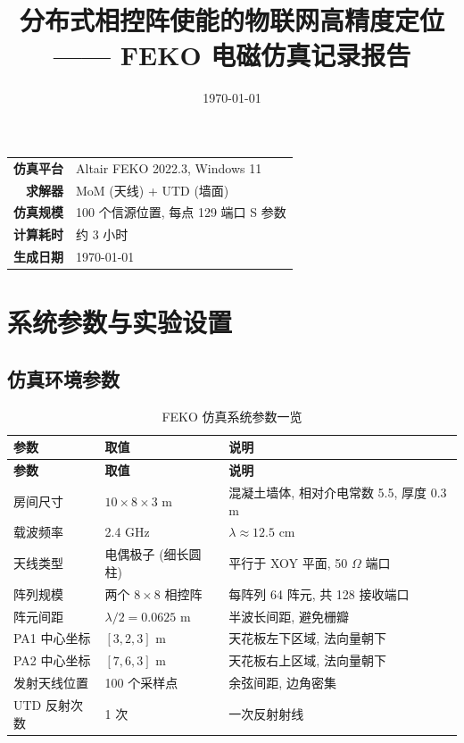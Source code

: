 \documentclass[12pt,a4paper]{ctexart}
\title{\textbf{分布式相控阵使能的物联网高精度定位\\—— FEKO 电磁仿真记录报告}}
\author{}
\date{\today}
\begin{document}
\maketitle

\begin{center}
\vspace{1cm}
\begin{tabular}{rl}
\toprule
\textbf{仿真平台} & Altair FEKO 2022.3, Windows 11 \\
\textbf{求解器}   & MoM (天线) + UTD (墙面) \\
\textbf{仿真规模} & 100 个信源位置, 每点 129 端口 S 参数 \\
\textbf{计算耗时} & 约 3 小时 \\
\textbf{生成日期} & \today \\
\bottomrule
\end{tabular}
\end{center}

\vspace{1cm}

\section{系统参数与实验设置}

\subsection{仿真环境参数}

\begin{longtable}{lll}
\caption{FEKO 仿真系统参数一览}\\
\toprule
\textbf{参数} & \textbf{取值} & \textbf{说明} \\
\midrule
\endfirsthead
\toprule
\textbf{参数} & \textbf{取值} & \textbf{说明} \\
\midrule
\endhead
\bottomrule
\endfoot
房间尺寸        & $10 \times 8 \times 3$ m  & 混凝土墙体, 相对介电常数 5.5, 厚度 0.3 m \\
载波频率        & 2.4 GHz                   & $\lambda \approx 12.5$ cm \\
天线类型        & 电偶极子 (细长圆柱)       & 平行于 XOY 平面, 50 $\Omega$ 端口 \\
阵列规模        & 两个 $8\times8$ 相控阵    & 每阵列 64 阵元, 共 128 接收端口 \\
阵元间距        & $\lambda/2 = 0.0625$ m    & 半波长间距, 避免栅瓣 \\
PA1 中心坐标    & $[3, 2, 3]$ m             & 天花板左下区域, 法向量朝下 \\
PA2 中心坐标    & $[7, 6, 3]$ m             & 天花板右上区域, 法向量朝下 \\
发射天线位置    & 100 个采样点              & 余弦间距, 边角密集 \\
UTD 反射次数    & 1 次                      & 一次反射射线 \\
\bottomrule
\end{longtable}
\end{document}

